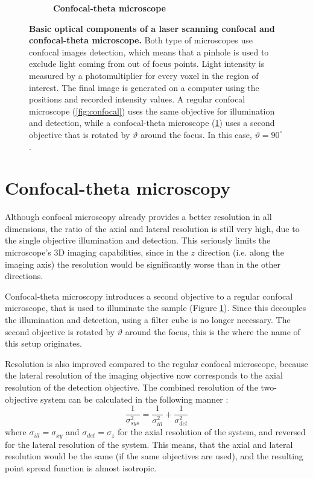 \documentclass{diploma_style}
\begin{document}
\begin{figure}
\begin{subfigure}[t]{0.49\textwidth}
	\caption{\textbf{Confocal-theta microscope}}
	\label{fig:conf-theta}
\end{subfigure}
\caption{\textbf{Basic optical components of a laser scanning confocal and confocal-theta microscope.} Both type of microscopes use confocal images detection, which means that a pinhole is used to exclude light coming from out of focus points. Light intensity is measured by a photomultiplier for every voxel in the region of interest. The final image is generated on a computer using the positions and recorded intensity values. A regular confocal microscope (\ref{fig:confocal}) uses the same objective for illumination and detection, while a confocal-theta microscope (\ref{fig:conf-theta}) uses a second objective that is rotated by $\vartheta$ around the focus. In this case, $\vartheta = 90^\circ$.}
\label{fig:confocals}
\end{figure}

\section{Confocal-theta microscopy}

Although confocal microscopy already provides a better resolution in all dimensions, the ratio of the axial and lateral resolution is still very high, due to the single objective illumination and detection. This seriously limits the microscope's 3D imaging capabilities, since in the $z$ direction (i.e. along the imaging axis) the resolution would be significantly worse than in the other directions.

Confocal-theta microscopy \cite{stelzer_fundamental_1994} introduces a second objective to a regular confocal microscope, that is used to illuminate the sample (Figure \ref{fig:conf-theta}). Since this decouples the illumination and detection, using a filter cube is no longer necessary. The second objective is rotated by $\vartheta$ around the focus, this is the where the name of this setup originates.

Resolution is also improved compared to the regular confocal microscope, because the lateral resolution of the imaging objective now corresponds to the axial resolution of the detection objective. The combined resolution of the two-objective system can be calculated in the following manner \cite{krzic_multiple-view_2009}:
\begin{equation}
\frac{1}{\sigma _{sys}^2} = \frac{1}{\sigma _{ill}^2} + \frac{1}{\sigma _{det}^2}
\end{equation}
where $\sigma_{ill} = \sigma_{xy}$ and $\sigma_{det} = \sigma_z$ for the axial resolution of the system, and reversed for the lateral resolution of the system. This means, that the axial and lateral resolution would be the same (if the same objectives are used), and the resulting point spread function is almost isotropic.
\end{document}
